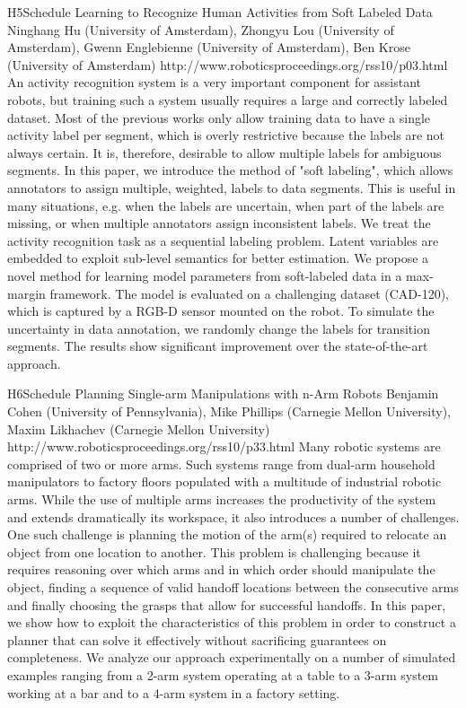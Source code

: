 \begin{spacing}{1.0}
\descriptionPaper
{H5}{Schedule}
{	
Learning to Recognize Human Activities from Soft Labeled Data
}
{
Ninghang Hu (University of Amsterdam), Zhongyu Lou (University of Amsterdam), Gwenn Englebienne (University of Amsterdam), Ben Krose (University of Amsterdam)
}
{
http://www.roboticsproceedings.org/rss10/p03.html
}
{
An activity recognition system is a very important component for assistant robots, but training such a system usually requires a large and correctly labeled dataset. Most of the previous works only allow training data to have a single activity label per segment, which is overly restrictive because the labels are not always certain. It is, therefore, desirable to allow multiple labels for ambiguous segments. In this paper, we introduce the method of "soft labeling", which allows annotators to assign multiple, weighted, labels to data segments. This is useful in many situations, e.g. when the labels are uncertain, when part of the labels are missing, or when multiple annotators assign inconsistent labels. We treat the activity recognition task as a sequential labeling problem. Latent variables are embedded to exploit sub-level semantics for better estimation. We propose a novel method for learning model parameters from soft-labeled data in a max-margin framework. The model is evaluated on a challenging dataset (CAD-120), which is captured by a RGB-D sensor mounted on the robot. To simulate the uncertainty in data annotation, we randomly change the labels for transition segments. The results show significant improvement over the state-of-the-art approach.
}




\descriptionPaper
{H6}{Schedule}
{	
Planning Single-arm Manipulations with n-Arm Robots
}
{
Benjamin Cohen (University of Pennsylvania), Mike Phillips (Carnegie Mellon University), Maxim Likhachev (Carnegie Mellon University)
}
{
http://www.roboticsproceedings.org/rss10/p33.html
}
{
Many robotic systems are comprised of two or more arms. Such systems range from dual-arm household manipulators to factory floors populated with a multitude of industrial robotic arms. While the use of multiple arms increases the productivity of the system and extends dramatically its workspace, it also introduces a number of challenges. One such challenge is planning the motion of the arm(s) required to relocate an object from one location to another. This problem is challenging because it requires reasoning over which arms and in which order should manipulate the object, finding a sequence of valid handoff locations between the consecutive arms and finally choosing the grasps that allow for successful handoffs. In this paper, we show how to exploit the characteristics of this problem in order to construct a planner that can solve it effectively without sacrificing guarantees on completeness. We analyze our approach experimentally on a number of simulated examples ranging from a 2-arm system operating at a table to a 3-arm system working at a bar and to a 4-arm system in a factory setting.
}





\end{spacing}
